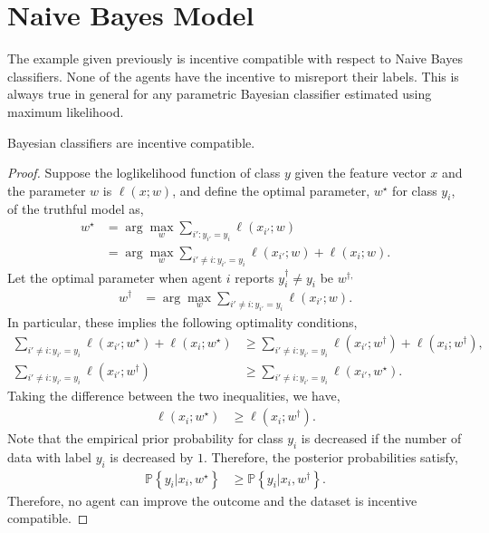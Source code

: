 \documentclass{article}
\begin{document}
\section{Naive Bayes Model} 
The example given previously is incentive compatible with respect to Naive Bayes classifiers. None of the agents have the incentive to misreport their labels. This is always true in general for any parametric Bayesian classifier estimated using maximum likelihood.
\newline \newline
\begin{prop} \label{prop:bc} 
Bayesian classifiers are incentive compatible.
\end{prop}
\begin{proof} \label{proof:bcpf} 
Suppose the loglikelihood function of class $y $ given the feature vector $x $ and the parameter $w $ is $\ell\left(x ; w \right)$, and define the optimal parameter, $w^\star $ for class $y_{i}$, of the truthful model as,
\begin{align*}
w^\star  &= \arg\displaystyle\max_{w} \displaystyle\sum_{i' : y_{i'} = y_{i}} \ell\left(x_{i'} ; w\right)
\\ &= \arg\displaystyle\max_{w} \displaystyle\sum_{i' \neq  i : y_{i'} = y_{i}} \ell\left(x_{i'} ; w\right) + \ell\left(x_{i} ; w\right).
\end{align*}
Let the optimal parameter when agent $i $ reports $y^{\dagger}_{i} \neq  y_{i}$ be $w^{\dagger,}$
\begin{align*}
w^{\dagger} &= \arg\displaystyle\max_{w} \displaystyle\sum_{i' \neq  i: y_{i'} = y_{i}} \ell\left(x_{i'} ; w\right).
\end{align*}
In particular, these implies the following optimality conditions,
\begin{align*}
\displaystyle\sum_{i' \neq  i : y_{i'} = y_{i}} \ell\left(x_{i'} ; w^\star \right) + \ell\left(x_{i} ; w^\star \right) &\geq  \displaystyle\sum_{i' \neq  i : y_{i'} = y_{i}} \ell\left(x_{i'} ; w^{\dagger}\right) + \ell\left(x_{i} ; w^{\dagger}\right),
\\ \displaystyle\sum_{i' \neq  i: y_{i'} = y_{i}} \ell\left(x_{i'} ; w^{\dagger}\right) &\geq  \displaystyle\sum_{i' \neq  i: y_{i'} = y_{i}} \ell\left(x_{i'}, w^\star \right).
\end{align*}
Taking the difference between the two inequalities, we have,
\begin{align*}
\ell\left(x_{i} ; w^\star \right) &\geq  \ell\left(x_{i} ; w^{\dagger}\right).
\end{align*}
Note that the empirical prior probability for class $y_{i}$ is decreased if the number of data with label $y_{i}$ is decreased by $1$. Therefore, the posterior probabilities satisfy,
\begin{align*}
\mathbb{P}\left\{y_{i} | x_{i}, w^\star \right\} &\geq  \mathbb{P}\left\{y_{i} | x_{i}, w^{\dagger}\right\}.
\end{align*}
Therefore, no agent can improve the outcome and the dataset is incentive compatible.
\newline \newline\end{proof}
\end{document}
